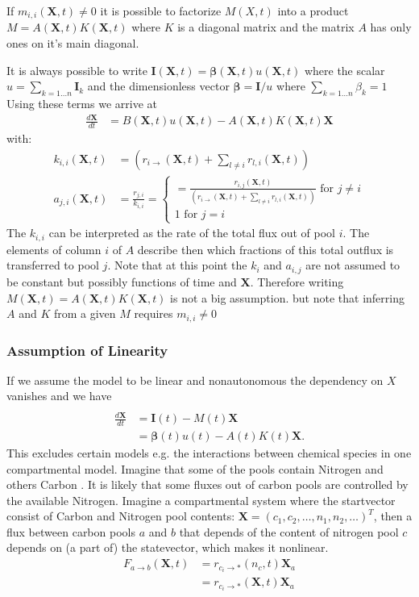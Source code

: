 \documentclass[journal abbreviation, manuscript]{copernicus}
\theoremstyle{definition}
\newcommand{\X}{\mathbf{X}}
\newcommand{\I}{\mathbf{I}}
\newcommand{\bv}{\bm{\beta}}
\begin{document}
If $m_{i,i}(\X,t) \ne 0$ it is possible to factorize $M(X,t)$ into a product $M=A(\X,t) K(\X,t)$ where $K$ is a  diagonal matrix and the matrix $A$ has only ones on it's main diagonal. 

It is always possible to write $\I(\X,t)=\bv(\X,t)u(\X,t)$ where the scalar $u=\sum_{k=1\dots n} \I_k$  and the dimensionless vector $\bv = \I/u$ where $\sum_{k=1\dots n} \beta_k =1$
Using these terms  we arrive at 
\begin{align*}
\frac{d \X}{d t}&=B(\X,t) u(\X,t) - A(\X,t) K(\X,t) \X   
\end{align*}
\newcommand{\kiixt}{
      \left(
      r_{i \rightarrow } (\X,t)
      + 
      \sum_{l \ne i} r_{l,i} (\X,t)
      \right)
}
with:
\begin{align}
  k_{i,i}(\X,t) &=\kiixt \nonumber
  \\
  a_{j,i}(\X,t)  
  &=\frac{r_{j,i}}{k_{i,i}}=
  \left\{
  \begin{matrix}
    =\frac{
    r_{i,j} (\X,t)
  }{
    \kiixt
  } \text{ for } j \ne i
  \\
  1 \text{ for } j=i
  \end{matrix}
  \right.
  \label{aij}
\end{align}
The $k_{i,i}$ can be interpreted as the rate of the total flux out of pool $i$. The elements of column $i$ of $A$ describe then which fractions of this total outflux is transferred to pool $j$. 
Note that at this point the $k_i$ and $a_{i,j}$ are not assumed to be constant but possibly functions of time and $\X$. Therefore writing $M(\X,t) = A(\X,t) K(\X,t)$ is not a big assumption.
but note that inferring $A$ and $K$ from a given $M$ requires $m_{i,i} \ne 0$

\subsubsection{Assumption of Linearity}
If we assume the model to be linear and nonautonomous the dependency on $X$ vanishes and we have
\begin{align*}
\end{align*}
\begin{align}
\frac{d \X}{d t}
  &=\I(t) - M(t) \X \label{massbalance_linear}
  \\
  &= \bv(t)u(t) - A(t) K(t) \X \nonumber .
\end{align} 
This excludes certain models e.g. the interactions between chemical species in one compartmental model. 
Imagine that some of the pools contain Nitrogen and others Carbon .
It is likely that some fluxes out of carbon pools are controlled by the
available Nitrogen.  
Imagine a compartmental system where the startvector
consist of Carbon and Nitrogen pool contents: $\X=(c_1,c_2,\dots,
n_1,n_2,\dots )^T$, then a flux between carbon pools $a$ and $b$ that
depends of the content of nitrogen pool $c$ depends on (a part of) the
statevector, which makes it nonlinear.
\begin{align*}
F_{a \rightarrow b} (\X,t)  &= r_{c_i \rightarrow *}(n_c,t) \X_a \\
                            &= r_{c_i \rightarrow *}(\X,t) \X_a
\end{align*}
\end{document}
